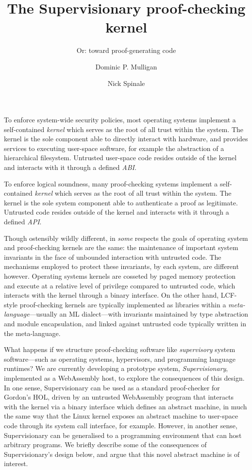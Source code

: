 \documentclass[sigplan, review]{acmart}
\title{The Supervisionary proof-checking kernel}
\subtitle{Or: toward proof-generating code}
\author{Dominic P. Mulligan}
\affiliation{
  \institution{Systems Research Group, Arm Research}
  \streetaddress{Fulbourn Road}
  \city{Cambridge}
  \country{United Kingdom}
}
\author{Nick Spinale}
\affiliation{
  \institution{Systems Research Group, Arm Research}
  \streetaddress{Fulbourn Road}
  \city{Cambridge}
  \country{United Kingdom}
}
\begin{document}
\maketitle

To enforce system-wide security policies, most operating systems implement a self-contained \emph{kernel} which serves as the root of all trust within the system.
The kernel is the sole component able to directly interact with hardware, and provides services to executing user-space software, for example the abstraction of a hierarchical filesystem.
Untrusted user-space code resides outside of the kernel and interacts with it through a defined \emph{ABI}.

To enforce logical soundness, many proof-checking systems implement a self-contained \emph{kernel} which serves as the root of all trust within the system.
The kernel is the sole system component able to authenticate a proof as legitimate.
Untrusted code resides outside of the kernel and interacts with it through a defined \emph{API}.

Though ostensibly wildly different, in \emph{some} respects the goals of operating system and proof-checking kernels are the same: the maintenance of important system invariants in the face of unbounded interaction with untrusted code.
The mechanisms employed to protect these invariants, by each system, are different however.
Operating systems kernels are cosseted by paged memory protection and execute at a relative level of privilege compared to untrusted code, which interacts with the kernel through a binary interface.
On the other hand, LCF-style proof-checking kernels are typically implemented as libraries within a \emph{meta-language}---usually an ML dialect---with invariants maintained by type abstraction and module encapsulation, and linked against untrusted code typically written in the meta-language.

What happens if we structure proof-checking software like \emph{supervisory} system software---such as operating systems, hypervisors, and programming language runtimes?
We are currently developing a prototype system, \emph{Supervisionary}, implemented as a WebAssembly host, to explore the consequences of this design.
In one sense, Supervisionary can be used as a standard proof-checker for Gordon's HOL, driven by an untrusted WebAssembly program that interacts with the kernel via a binary interface which defines an abstract machine, in much the same way that the Linux kernel exposes an abstract machine to user-space code through its system call interface, for example.
However, in another sense, Supervisionary can be generalised to a programming environment that can host arbitrary programs.
We briefly describe some of the consequences of Supervisionary's design below, and argue that this novel abstract machine is of interest.
\end{document}
